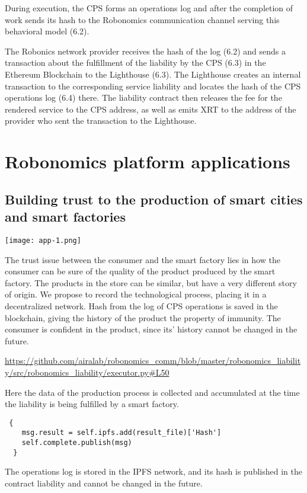 \documentclass{article}
\begin{document}
During execution, the CPS forms an operations log and after the completion of work sends its hash to the Robonomics communication channel serving this behavioral model (6.2).

The Robonics network provider receives the hash of the log (6.2) and sends a transaction about the fulfillment of the liability by the CPS (6.3) in the Ethereum Blockchain to the Lighthouse (6.3). The Lighthouse creates an internal transaction to the corresponding service liability and locates the hash of the CPS operations log (6.4) there. The liability contract then releases the fee for the rendered service to the CPS address, as well as emits XRT to the address of the provider who sent the transaction to the Lighthouse.

\section{Robonomics platform applications}

\subsection{Building trust to the production of smart cities and smart factories}

\texttt{[image: app-1.png]} 

The trust issue between the consumer and the smart factory lies in how the consumer can be sure of the quality of the product produced by the smart factory. The products in the store can be similar, but have a very different story of origin. We propose to record the technological process, placing it in a decentralized network. Hash from the log of CPS operations is saved in the blockchain, giving the history of the product the property of immunity. The consumer is confident in the product, since its' history cannot be changed in the future.

\url{https://github.com/airalab/robonomics_comm/blob/master/robonomics_liability/src/robonomics_liability/executor.py#L50}

Here the data of the production process is collected and accumulated at the time the liability is being fulfilled by a smart factory.


\begin{lstlisting}
 {
	msg.result = self.ipfs.add(result_file)['Hash']
	self.complete.publish(msg)
  }
\end{lstlisting}


The operations log is stored in the IPFS network, and its hash is published in the contract liability and cannot be changed in the future.
\end{document}
